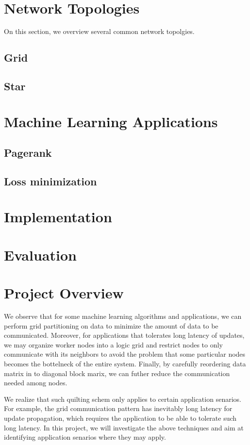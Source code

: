 \documentclass{acm_proc_article-sp}
\begin{document}
\section{Network Topologies}

On this section, we overview several common network topolgies.
\subsection{Grid}
\subsection{Star}
\section{Machine Learning Applications}

\subsection{Pagerank}
\subsection{Loss minimization}

\section{Implementation}

\section{Evaluation}

\appendix
\section{Project Overview}

We observe that for some machine learning algorithms and applications, we can
perform grid partitioning on data to minimize the amount of data to be
communicated. Moreover, for applications that tolerates long latency of updates,
we may organize worker nodes into a logic grid and restrict nodes to only
communicate with its neighbors to avoid the problem that some particular nodes
becomes the bottelneck of the entire system. Finally, by carefully reordering
data matrix in to diagonal block marix, we can futher reduce the
communication needed among nodes.

We realize that such quilting schem only applies to certain application
senarios. For example, the grid communication pattern has inevitably long
latency for update propagation, which requires the application to be able to
tolerate such long latency. In this project, we will investigate the above
techniques and aim at identifying application senarios where they may apply.
\end{document}
